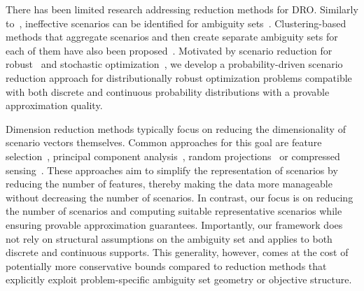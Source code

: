 \documentclass{article}
\begin{document}
There has been limited research addressing reduction methods for DRO.
Similarly to~\cite{arpon2018scenario}, ineffective scenarios can be identified for ambiguity sets~\cite{rahimian2022effective, rahimian2019identifying}.
Clustering-based methods that aggregate scenarios and then create separate ambiguity sets for each of them have also been proposed~\cite{zhang2023stochastic}.
Motivated by scenario reduction for robust~\cite{goerigk_scen_reduction} and stochastic optimization~\cite{bertsimas2023optimization}, we develop a probability-driven scenario reduction approach for distributionally robust optimization problems compatible with both discrete and continuous probability distributions with a provable approximation quality. 

Dimension reduction methods typically focus on reducing the dimensionality of scenario vectors themselves.
Common approaches for this goal are feature selection~\cite{feature_selection}, principal component analysis~\cite{PCA_Pearson, pca}, random projections~\cite{random_projection} or compressed sensing~\cite{compressed_sensing}.
These approaches aim to simplify the representation of scenarios by reducing the number of features, thereby making the data more manageable without decreasing the number of scenarios.
In contrast, our focus is on reducing the number of scenarios and computing suitable representative scenarios while ensuring provable approximation guarantees. 
Importantly, our framework does not rely on structural assumptions on the ambiguity set and applies to both discrete and continuous supports. 
This generality, however, comes at the cost of potentially more conservative bounds compared to reduction methods that explicitly exploit problem-specific ambiguity set geometry or objective structure.

\end{document}
